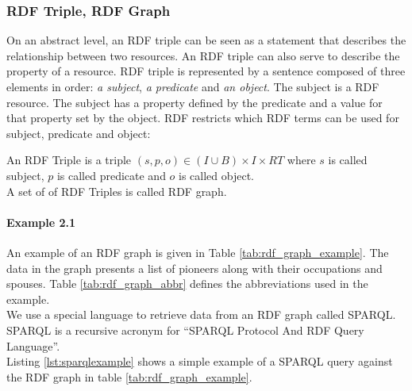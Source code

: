 \subsubsection{RDF Triple, RDF Graph} On an abstract level, an RDF triple can be seen as a statement that describes the relationship between two resources. An RDF triple can also serve to describe the property of a resource. RDF triple is represented by a sentence composed of three elements in order: \textit{a subject}, \textit{a predicate} and \textit{an object}.
The subject is a RDF resource. The subject has a property defined by the predicate and a value for that property set by the object.
RDF restricts which RDF terms can be used for subject, predicate and object:

\begin{definition}
An RDF Triple is a triple $(s, p, o) \in ( I \cup B ) \times I \times RT$ where $s$ is called subject, $p$ is called predicate and $o$ is called object. \\
A set of of RDF Triples is called RDF graph.
\end{definition}

\paragraph{Example 2.1}
An example of an RDF graph is given in Table \ref{tab:rdf_graph_example}. 
The data in the graph presents a list of pioneers along with their occupations and spouses. Table \ref{tab:rdf_graph_abbr} defines the abbreviations used in the example. \\

We use a special language to retrieve data from an RDF graph called SPARQL. SPARQL \cite{asd} is a recursive acronym for “SPARQL Protocol And RDF Query Language”. \\

Listing \ref{lst:sparqlexample} shows a simple example of a SPARQL query
against the RDF graph in table \ref{tab:rdf_graph_example}. \\

